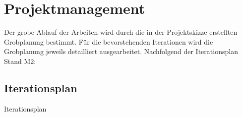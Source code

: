 \documentclass[11pt,ngerman]{article}
\begin{document}
    \section{Projektmanagement}
    Der grobe Ablauf der Arbeiten wird durch die in der Projektskizze erstellten Grobplanung bestimmt. Für die bevorstehenden Iterationen wird die Grobplanung jeweils detailliert ausgearbeitet. Nachfolgend der Iterationsplan Stand M2:

    \subsection{Iterationsplan}
    \begin{table}[H]
        \caption{Iterationsplan}
        \begin{tabularx}{\textwidth}{l l l l l l l}
            \toprule





            



            \toprule
        \end{tabularx}
        \label{tab:Iterationsplan}
    \end{table}
\end{document}
